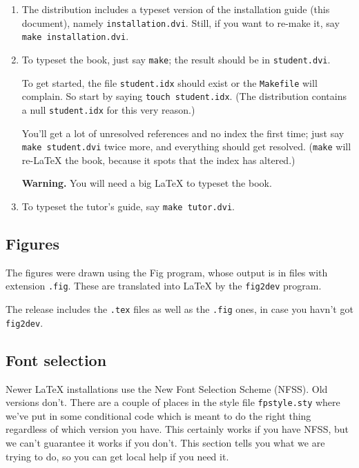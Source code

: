 \begin{enumerate}
\item
The distribution includes a typeset version of the installation guide (this
document), namely \mbox{\tt installation.dvi}.  Still, if you want to re-make it, 
say \mbox{\tt make\ installation.dvi}.
\item
To typeset the book, just say \mbox{\tt make}; the result should be in \mbox{\tt student.dvi}.  

To get started, the file \mbox{\tt student.idx} should exist or the \mbox{\tt Makefile} will
complain.  So start by saying \mbox{\tt touch\ student.idx}.  (The distribution
contains a null \mbox{\tt student.idx} for this very reason.)

You'll get a lot of unresolved references and no index the first time; just 
say \mbox{\tt make\ student.dvi} twice more, and everything should get resolved.  (\mbox{\tt make} will
re-\LaTeX{} the book, because it spots that the index has altered.)

{\bf Warning.}  You will need a big \LaTeX{} to typeset the book.
\item
To typeset the tutor's guide, say \mbox{\tt make\ tutor.dvi}.
\end{enumerate}

\subsection{Figures}

The figures were drawn using the Fig program, whose output is in files
with extension \mbox{\tt .fig}.  These are translated into \LaTeX{} by the \mbox{\tt fig2dev} 
program.

The release includes the \mbox{\tt .tex} files as well as the \mbox{\tt .fig} ones, 
in case you havn't got \mbox{\tt fig2dev}.

\subsection{Font selection}

Newer \LaTeX{} installations use the New Font Selection Scheme (NFSS).
Old versions don't.  There are a couple of places in the style file \mbox{\tt fpstyle.sty}
where we've put in some conditional code which is meant to do the right thing
regardless of which version you have.  This certainly works if you have NFSS, 
but we can't guarantee it works if you don't.  This section tells you what
we are trying to do, so you can get local help if you need it.

